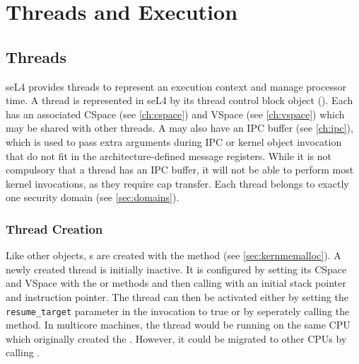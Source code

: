 %
%
%
%

\chapter{\label{ch:threads}Threads and Execution}

\section{Threads}
\label{sec:threads}

seL4 provides threads to represent an execution context and manage
processor time. A thread is represented in seL4 by its thread control block
object (). Each  has an associated CSpace (see
\autoref{ch:cspace}) and VSpace (see \autoref{ch:vspace}) which
may be shared with other threads. A  may also have an IPC buffer
(see  \autoref{ch:ipc}), which is used to pass extra arguments during IPC
or kernel object invocation that do not fit in the architecture-defined message
registers. While it is not compulsory that a thread has an IPC buffer,
it will not be able to perform most kernel invocations, as they require
cap transfer.
Each thread belongs to exactly one security domain (see
\autoref{sec:domains}).

\subsection{Thread Creation}
\label{sec:thread_creation}

Like other objects, s are created with the
 method (see
\autoref{sec:kernmemalloc}). A newly created thread is initially inactive. It
is configured by setting its CSpace and VSpace with the
or  methods and then calling
 with an initial stack pointer and instruction
pointer. The thread can then be activated either by setting the
\texttt{resume\_target} parameter in the  invocation to true
or by seperately calling the  method. In multicore machines, the thread
would be running on the same CPU which originally created the . However, it could be migrated to other CPUs
by calling .

